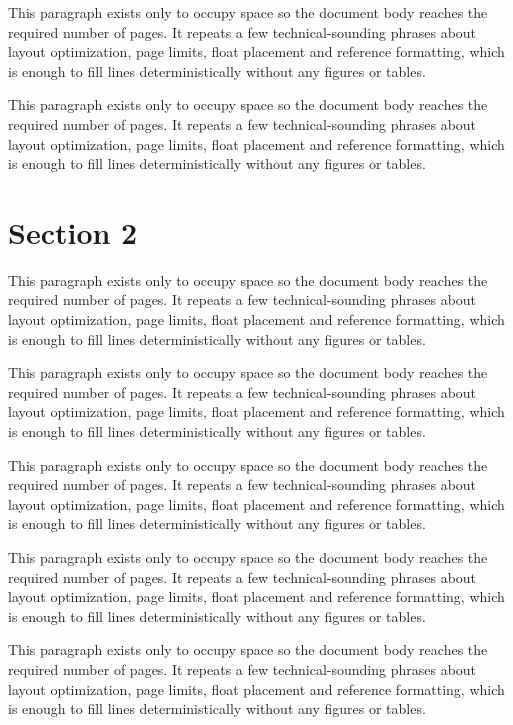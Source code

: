 \documentclass[10pt,letterpaper]{article}
\begin{document}
This paragraph exists only to occupy space so the document body reaches the required number of pages. It repeats a few technical-sounding phrases about layout optimization, page limits, float placement and reference formatting, which is enough to fill lines deterministically without any figures or tables.

This paragraph exists only to occupy space so the document body reaches the required number of pages. It repeats a few technical-sounding phrases about layout optimization, page limits, float placement and reference formatting, which is enough to fill lines deterministically without any figures or tables.

\section{Section 2}
This paragraph exists only to occupy space so the document body reaches the required number of pages. It repeats a few technical-sounding phrases about layout optimization, page limits, float placement and reference formatting, which is enough to fill lines deterministically without any figures or tables.

This paragraph exists only to occupy space so the document body reaches the required number of pages. It repeats a few technical-sounding phrases about layout optimization, page limits, float placement and reference formatting, which is enough to fill lines deterministically without any figures or tables.

This paragraph exists only to occupy space so the document body reaches the required number of pages. It repeats a few technical-sounding phrases about layout optimization, page limits, float placement and reference formatting, which is enough to fill lines deterministically without any figures or tables.

This paragraph exists only to occupy space so the document body reaches the required number of pages. It repeats a few technical-sounding phrases about layout optimization, page limits, float placement and reference formatting, which is enough to fill lines deterministically without any figures or tables.

This paragraph exists only to occupy space so the document body reaches the required number of pages. It repeats a few technical-sounding phrases about layout optimization, page limits, float placement and reference formatting, which is enough to fill lines deterministically without any figures or tables.
\end{document}
